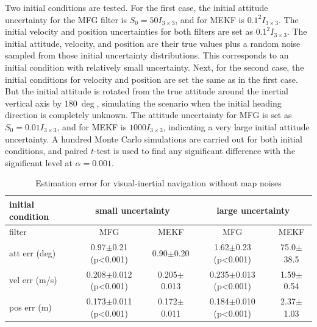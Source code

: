 Two initial conditions are tested.
For the first case, the initial attitude uncertainty for the MFG filter is $S_0 = 50I_{3\times 3}$, and for MEKF is $0.1^2I_{3\times 3}$.
The initial velocity and position uncertainties for both filters are set as $0.1^2I_{3\times 3}$.
The initial attitude, velocity, and position are their true values plus a random noise sampled from those initial uncertainty distributions.
This corresponds to an initial condition with relatively small uncertainty.
Next, for the second case, the initial conditions for velocity and position are set the same as in the first case.
But the initial attitude is rotated from the true attitude around the inertial vertical axis by $\SI{180}{\deg}$, simulating the scenario when the initial heading direction is completely unknown.
The attitude uncertainty for MFG is set as $S_0 = 0.01I_{3\times 3}$, and for MEKF is $1000I_{3\times 3}$, indicating a very large initial attitude uncertainty.
A hundred Monte Carlo simulations are carried out for both initial conditions, and paired $t$-test is used to find any significant difference with the significant level at $\alpha = 0.001$.

\begin{table}
	\centering
	\footnotesize
	\caption{Estimation error for visual-inertial navigation without map noises}
	\label{tab:VIO-filter-error}
	\begin{tabular}{l|c|c|c|c}
		\hline\hline
		initial condition & \multicolumn{2}{c|}{small uncertainty} & \multicolumn{2}{c}{large uncertainty} \\ \hline
		filter & MFG & MEKF & MFG & MEKF \\ \hline
		att err (deg) & 0.97$\pm$0.21 (p<0.001) & 0.90$\pm$0.20 & 1.62$\pm$0.23 (p<0.001) & 75.0$\pm$38.5 \\
		vel err (m/s) & 0.208$\pm$0.012 (p<0.001) & 0.205$\pm$0.013 & 0.235$\pm$0.013 (p<0.001) & 1.59$\pm$0.54 \\
		pos err (m) & 0.173$\pm$0.011 (p<0.001) & 0.172$\pm$0.011 & 0.184$\pm$0.010 (p<0.001) & 2.37$\pm$1.03 \\
		\hline\hline
	\end{tabular}
\end{table}

